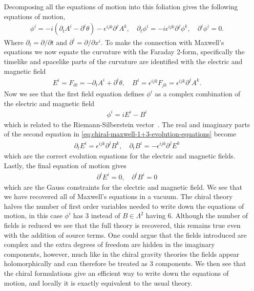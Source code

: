 \documentclass[10pt]{report}
\theoremstyle{definition}
\begin{document}
Decomposing all the equations of motion into this foliation gives the following equations of motion,
\begin{align}
    \phi^i = -i (\partial_t A^i - \partial^i \theta) - \epsilon^{ijk} \partial^j A^k, \quad \partial_t \phi^i = -i \epsilon^{ijk} \partial^j \phi^k, \quad  \partial^i \phi^i = 0. \label{eq:chiral-maxwell-1+3-evolution-equations}
\end{align}
Where $\partial_t = \partial/\partial t$ and $\partial^i = \partial/\partial x^i$. To make the connection with Maxwell's equations we now equate the curvature with the Faraday 2-form, specifically the timelike and spacelike parts of the curvature are identified with the electric and magnetic field 
\begin{align}
    E^i = F_{i0} = -\partial_t A^i + \partial^i \theta, \quad B^i = \epsilon^{ijk} F_{jk} = \epsilon^{ijk} \partial^j A^k.
\end{align}
Now we see that the first field equation defines $\phi^i$ as a complex combination of the electric and magnetic field 
\begin{align}
    \phi^i = i E^i - B^i
\end{align}
which is related to the Riemann-Silberstein vector~\cite{Elektromagnetis_Silber_1907}. The real and imaginary parts of the second equation in \cref{eq:chiral-maxwell-1+3-evolution-equations} become 
\begin{align}
    \partial_t E^i = \epsilon^{ijk} \partial^j B^k, \quad \partial_t B^i = -\epsilon^{ijk} \partial^j E^k
\end{align}
which are the correct evolution equations for the electric and magnetic fields. Lastly, the final equation of motion gives 
\begin{align}
    \partial^i E^i = 0, \quad \partial^i B^i = 0
\end{align}
which are the Gauss constraints for the electric and magnetic field. We see that we have recovered all of Maxwell's equations in a vacuum. The chiral theory halves the number of first order variables needed to write down the equations of motion, in this case $\phi^i$ has 3 instead of $B \in \Lambda^2$ having 6. Although the number of fields is reduced we see that the full theory is recovered, this remains true even with the addition of source terms. One could argue that the fields introduced are complex and the extra degrees of freedom are hidden in the imaginary components, however, much like in the chiral gravity theories the fields appear holomorphically and can therefore be treated as 3 components. We then see that the chiral formulations give an efficient way to write down the equations of motion, and locally it is exactly equivalent to the usual theory.
\end{document}

